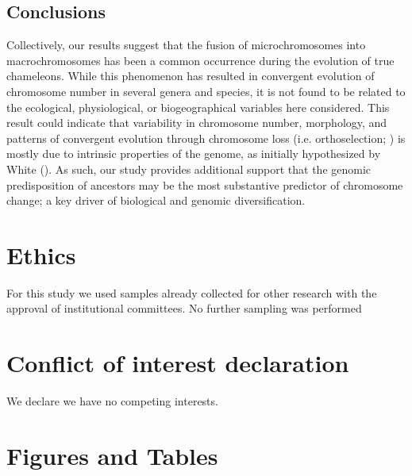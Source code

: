 \documentclass[a4paper, 12pt]{article}
\begin{document}
\subsection{Conclusions}
Collectively, our results suggest that the fusion of microchromosomes into macrochromosomes has been a common occurrence during the evolution of true chameleons. 
While this phenomenon has resulted in convergent evolution of chromosome number in several genera and species, it is not found to be related to the ecological, physiological, or biogeographical variables here considered. 
This result could indicate that variability in chromosome number, morphology, and patterns of convergent evolution through chromosome loss (i.e. orthoselection; \citealt{white1973}) is mostly due to intrinsic properties of the genome, as initially hypothesized by White (\citeyear{white1975chromosome}). 
As such, our study provides additional support that the genomic predisposition of ancestors may be the most substantive predictor of chromosome change; a key driver of biological and genomic diversification.

\section{Ethics}
For this study we used samples already collected for other research with the approval of institutional committees. No further sampling was performed

\section{Conflict of interest declaration}
We declare we have no competing interests.




\section{Figures and Tables}
\end{document}
